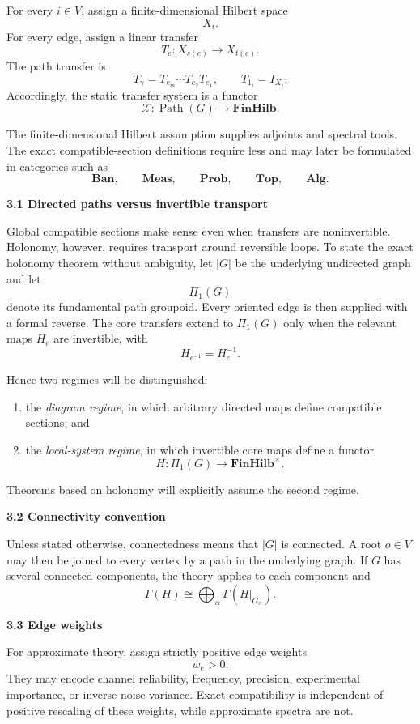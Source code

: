 \documentclass[11pt,letterpaper]{article}
\newcommand{\Path}{\operatorname{Path}}
\newcommand{\subtopic}[1]{%
 \vspace{0.45em}
 {\bfseries\color{AccentColor} #1\par}
}
\theoremstyle{plain}
\theoremstyle{definition}
\begin{document}
For every \(i\in V\), assign a finite-dimensional Hilbert space
\[
X_i.
\]
For every edge, assign a linear transfer
\[
T_e:X_{s(e)}\longrightarrow X_{t(e)}.
\]
The path transfer is
\[
T_\gamma=T_{e_m}\cdots T_{e_2}T_{e_1},
\qquad
T_{1_i}=I_{X_i}.
\]
Accordingly, the static transfer system is a functor
\[
\mathcal X:\Path(G)\longrightarrow\mathbf{FinHilb}.
\]

The finite-dimensional Hilbert assumption supplies adjoints and spectral
tools. The exact compatible-section definitions require less and may later be
formulated in categories such as
\[
\mathbf{Ban},\qquad
\mathbf{Meas},\qquad
\mathbf{Prob},\qquad
\mathbf{Top},\qquad
\mathbf{Alg}.
\]

\subtopic{3.1 Directed paths versus invertible transport}

Global compatible sections make sense even when transfers are noninvertible.
Holonomy, however, requires transport around reversible loops. To state the
exact holonomy theorem without ambiguity, let \(|G|\) be the underlying
undirected graph and let
\[
\Pi_1(G)
\]
denote its fundamental path groupoid. Every oriented edge is then supplied
with a formal reverse. The core transfers extend to \(\Pi_1(G)\) only when
the relevant maps \(H_e\) are invertible, with
\[
H_{e^{-1}}=H_e^{-1}.
\]

Hence two regimes will be distinguished:
\begin{enumerate}
\item the \emph{diagram regime}, in which arbitrary directed maps define
compatible sections; and
\item the \emph{local-system regime}, in which invertible core maps define a
functor
\[
H:\Pi_1(G)\to\mathbf{FinHilb}^{\times}.
\]
\end{enumerate}
Theorems based on holonomy will explicitly assume the second regime.

\subtopic{3.2 Connectivity convention}

Unless stated otherwise, connectedness means that \(|G|\) is connected. A
root \(o\in V\) may then be joined to every vertex by a path in the underlying
graph. If \(G\) has several connected components, the theory applies to each
component and
\[
\Gamma(H)
\cong
\bigoplus_{\alpha}\Gamma(H|_{G_\alpha}).
\]

\subtopic{3.3 Edge weights}

For approximate theory, assign strictly positive edge weights
\[
w_e>0.
\]
They may encode channel reliability, frequency, precision, experimental
importance, or inverse noise variance. Exact compatibility is independent of
positive rescaling of these weights, while approximate spectra are not.
\end{document}
